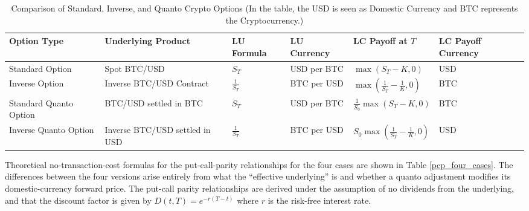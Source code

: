 \documentclass[12pt]{article}
\begin{document}
\begin{table}[!htbp]\label{options}
\centering
\renewcommand{\arraystretch}{1.3}
\begin{tabularx}{\textwidth}{|>{\RaggedRight\arraybackslash}p{1.5cm}|>{\RaggedRight\arraybackslash}p{2.5cm}|>{\RaggedRight\arraybackslash}p{1.5cm}|>{\RaggedRight\arraybackslash}p{2.5cm}|>{\RaggedRight\arraybackslash}X|>{\RaggedRight\arraybackslash}p{1.5cm}|}
\hline
\textbf{Option Type} & \textbf{Underlying Product} & \textbf{LU Formula} &
\textbf{LU Currency} & \textbf{LC Payoff at $T$} & \textbf{LC Payoff Currency} \\
\hline

Standard Option
& Spot BTC/USD
& $S_T$
& USD per BTC
& $\max(S_T - K,0)$
& USD \\
\hline

Inverse Option
& Inverse BTC/USD Contract
& $\displaystyle \frac{1}{S_T}$
& BTC per USD
& $\displaystyle \max\!\left(\frac{1}{S_T}-\frac{1}{K},0\right)$
& BTC \\
\hline

Standard Quanto Option
& BTC/USD settled in BTC
& $S_T$
& USD per BTC
& $\displaystyle \frac{1}{S_0}\max(S_T-K,0)$
& BTC \\
\hline

Inverse Quanto Option
& Inverse BTC/USD settled in USD
& $\displaystyle \frac{1}{S_T}$
& BTC per USD
& $\displaystyle S_0 \max\!\left(\frac{1}{S_T}-\frac{1}{K},0\right)$
& USD \\
\hline

\end{tabularx}
\caption{Comparison of Standard, Inverse, and Quanto Crypto Options (In the table, the USD is seen as Domestic Currency and BTC represents the Cryptocurrency.) \citep{alexander2023crypto}}
\label{options_by_other_authors}
\end{table}

Theoretical no-transaction-cost formulas for the put-call-parity relationships for the four cases are shown in Table \ref{pcp_four_cases}. The differences between the four versions arise entirely from what the ``effective underlying'' is and whether a quanto adjustment modifies its domestic-currency forward price. The put-call parity relationships are derived under the assumption of no dividends from the underlying, and that the discount factor is given by $D(t,T)=e^{-r(T-t)}$ where $r$ is the risk-free interest rate.
\end{document}
